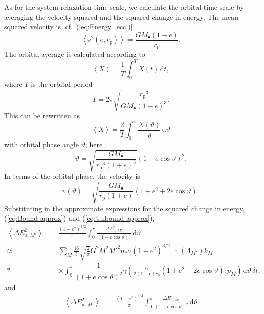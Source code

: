 \documentclass[useAMS,usedcolumn,usegraphicx,usenatbib]{mn2e}
\newcommand{\eqnref}[1]{(\ref{eq:#1})}
\newcommand{\sub}[1]{\ensuremath{_\mathrm{#1}}}
\newcommand{\dd}{\ensuremath{\mathrm{d}}}
\newcommand{\intd}[4]{\ensuremath{\displaystyle \int_{#1}^{#2}{#3}\,\dd{#4}}}
\newcommand{\recip}[1]{\ensuremath{\dfrac{1}{#1}}}
\begin{document}
\begin{onecolumn}
As for the system relaxation time-scale, we calculate the orbital time-scale by averaging the velocity squared and the squared change in energy. The mean squared velocity is [cf.\ \eqnref{Energy_ecc}]
\begin{equation}
\left\langle v^2\left(e,r\sub{p}\right)\right\rangle = \frac{GM_\bullet(1 - e)}{r\sub{p}}.
\end{equation}
The orbital average is calculated according to \citep[section 2.2b]{Spitzer1987}
\begin{equation}
\left\langle X\right\rangle = \recip{T}\intd{0}{T}{X(t)}{t},
\end{equation}
where $T$ is the orbital period
\begin{equation}
T = 2\pi\sqrt{\frac{r\sub{p}^3}{GM_\bullet(1-e)^{3}}}.
\end{equation}
 This can be rewritten as
\begin{equation}
\left\langle X\right\rangle = \frac{2}{T}\intd{0}{\pi}{\frac{X(\vartheta)}{\dot{\vartheta}}}{\vartheta}
\end{equation}
with orbital phase angle $\vartheta$; here
\begin{equation}
\dot{\vartheta} = \sqrt{\frac{GM_\bullet}{r\sub{p}^3(1+e)^3}}(1 + e \cos\vartheta)^2.
\end{equation}
In terms of the orbital phase, the velocity is
\begin{equation}
v(\vartheta) = \sqrt{\frac{GM_\bullet}{r\sub{p}(1+e)}\left(1 + e^2 + 2e\cos\vartheta\right)}.
\end{equation}
Substituting in the approximate expressions for the squared change in energy, \eqnref{Bound-approx} and \eqnref{Unbound-approx},
\begin{align}
\left\langle\Delta E^2_{\mathrm{b},\,M'}\right\rangle = {} & \frac{\left(1-e^2\right)^{3/2}}{\pi}\intd{0}{\pi}{\frac{\Delta E^2_{\mathrm{b},\,M'}}{(1 + e \cos\vartheta)^2}}{\vartheta} \\
 \approx {} & \sum_M \frac{16}{3}\sqrt{\frac{2}{\pi}}G^2 M^2{M'}^2n_\ast\sigma\left(1-e^2\right)^{3/2}\ln\left(\Lambda_{M'}\right)k_M \nonumber \\*
 & \times {} \intd{0}{\pi}{\recip{(1 + e \cos\vartheta)^2} \gamma\left(\frac{r\sub{c}}{2(1+e)r\sub{p}}\left(1+e^2+2e\cos\vartheta\right);p_M\right)}{\vartheta}\,\delta t,
\end{align}
and
\begin{align}
\left\langle\Delta E^2_{\mathrm{u},\,M'}\right\rangle = {} & \frac{\left(1-e^2\right)^{3/2}}{\pi}\intd{0}{\pi}{\frac{\Delta E^2_{\mathrm{u},\,M'}}{(1 + e \cos\vartheta)^2}}{\vartheta} \\

\end{align}
\end{onecolumn}
\end{document}
